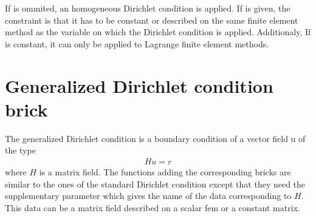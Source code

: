 \documentclass[a4paper,11pt,english]{sphinxmanual}
\begin{document}
\begin{sphinxVerbatim}[commandchars=\\\{\}]
  
                                            
\end{sphinxVerbatim}

If  is ommited, an homogeneous Dirichlet condition is applied. If  is given, the constraint is that it has to be constant or described on the same finite element method as the variable  on which the Dirichlet condition is applied. Additionaly, If  is constant, it can only be applied to Lagrange finite element methods.


\section{Generalized Dirichlet condition brick}
\label{\detokenize{userdoc/model_dirichlet:generalized-dirichlet-condition-brick}}
The generalized Dirichlet condition is a boundary condition of a vector field u of
the type
\begin{equation*}
\begin{split}H u  = r\end{split}
\end{equation*}
where \(H\) is a matrix field. The functions adding the corresponding bricks
are similar to the ones of the standard Dirichlet condition except that they need
the supplementary parameter  which gives the name of the data corresponding
to \(H\). This data can be a matrix field described on a scalar fem or a
constant matrix.
\end{document}
